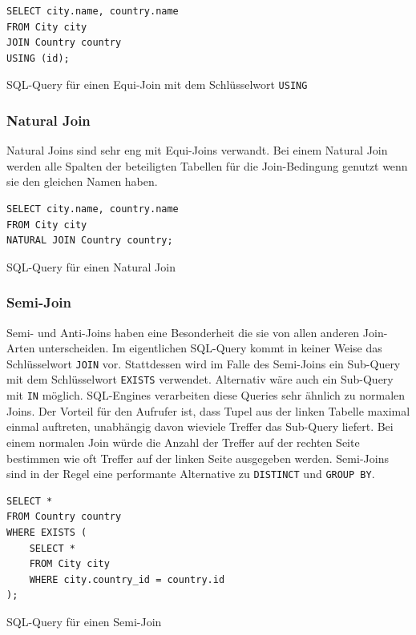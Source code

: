 \documentclass[a4paper]{article}
\begin{document}
\begin{listing}[H]
\begin{verbatim}
SELECT city.name, country.name 
FROM City city
JOIN Country country 
USING (id);
\end{verbatim}
\caption{SQL-Query für einen Equi-Join mit dem Schlüsselwort \texttt{USING}}
\label{lst:equi-join-using}
\end{listing}

\subsubsection{Natural Join}
\label{sec:natural-join}
Natural Joins sind sehr eng mit Equi-Joins verwandt. Bei einem Natural Join werden alle Spalten der beteiligten Tabellen für die Join-Bedingung genutzt wenn sie den gleichen Namen haben.

\begin{listing}[H]
\begin{verbatim}
SELECT city.name, country.name 
FROM City city
NATURAL JOIN Country country;
\end{verbatim}
\caption{SQL-Query für einen Natural Join}
\label{lst:natural-join}
\end{listing}

\newpage
\subsubsection{Semi-Join}
Semi- und Anti-Joins haben eine Besonderheit die sie von allen anderen Join-Arten unterscheiden. Im eigentlichen SQL-Query kommt in keiner Weise das Schlüsselwort \texttt{JOIN} vor. Stattdessen wird im Falle des Semi-Joins ein Sub-Query mit dem Schlüsselwort \texttt{EXISTS} verwendet. Alternativ wäre auch ein Sub-Query mit \texttt{IN} möglich. SQL-Engines verarbeiten diese Queries sehr ähnlich zu normalen Joins. Der Vorteil für den Aufrufer ist, dass Tupel aus der linken Tabelle maximal einmal auftreten, unabhängig davon wieviele Treffer das Sub-Query liefert. Bei einem normalen Join würde die Anzahl der Treffer auf der rechten Seite bestimmen wie oft Treffer auf der linken Seite ausgegeben werden. Semi-Joins sind in der Regel eine performante Alternative zu \texttt{DISTINCT} und \texttt{GROUP BY}.

\begin{listing}[H]
\begin{verbatim}
SELECT *
FROM Country country
WHERE EXISTS (
	SELECT * 
	FROM City city 
	WHERE city.country_id = country.id
);
\end{verbatim}
\caption{SQL-Query für einen Semi-Join}
\label{lst:semi-join}
\end{listing}
\end{document}
